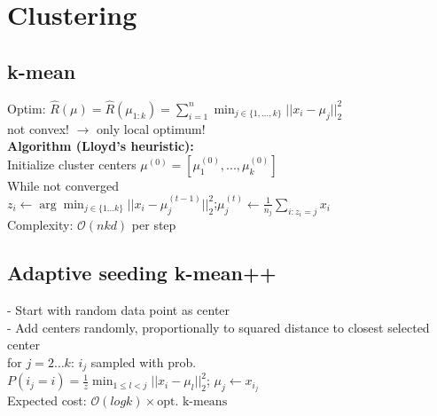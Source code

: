 \section*{\normalsize{Clustering}}
\subsection*{k-mean}
Optim: $\hat{R}(\mu) = \hat{R}(\mu_{1:k}) = \sum_{i=1}^n \min_{j\in\{1,...,k\}} ||x_i-\mu_j||_2^2$\\
not convex! $\rightarrow$ only local optimum!\\
\textbf{Algorithm (Lloyd's heuristic):}\\
Initialize cluster centers $\mu^{(0)} = [\mu_1^{(0)},...,\mu_k^{(0)}]$\\
While not converged\\
$z_i \leftarrow \arg \min_{j\in\{1...k\}}||x_i - \mu_j^{(t-1)}||_2^2$;$\mu_j^{(t)} \leftarrow \frac{1}{n_j}\sum_{i:z_i=j}x_i$\\
Complexity: $\mathcal{O}(nkd)$ per step

\subsection*{Adaptive seeding k-mean++}
- Start with random data point as center\\
- Add centers randomly, proportionally to squared distance to closest selected center\\
for $j=2 \dots k$:
$i_j$ sampled with prob.\\
$P(i_j=i) = \frac{1}{z}\min_{1\leq l<j}||x_i-\mu_l||_2^2$; $\mu_j \leftarrow x_{i_j}$\\
Expected cost: $\mathcal{O}(log k)\times \text{opt. k-means}$